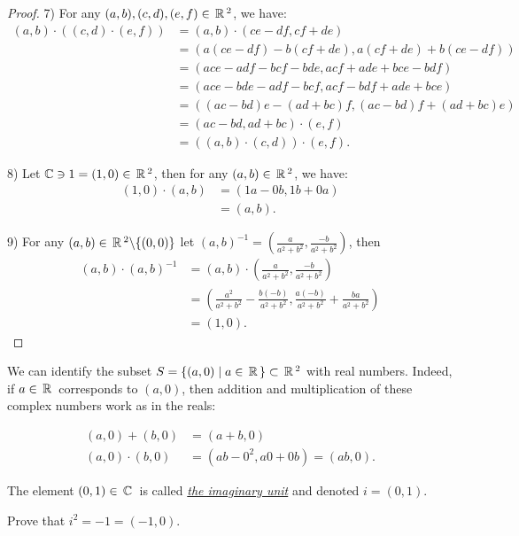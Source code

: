\begin{proof}
7) For any $(a, b),(c, d),(e, f) \in \,\mathbb{R}\,^2$, we have:
$$
\begin{aligned}
(a, b) \cdot((c, d) \cdot(e, f)) & =(a, b) \cdot(c e-d f, c f+d e) \\
& =(a(c e-d f)-b(c f+d e), a(c f+d e)+b(c e-d f)) \\
& =(a c e-a d f-b c f-b d e, a c f+a d e+b c e-b d f) \\
& =(a c e-b d e-a d f-b c f, a c f-b d f+a d e+b c e) \\
& =((a c-b d) e-(a d+b c) f,(a c-b d) f+(a d+b c) e) \\
& =(a c-b d, a d+b c) \cdot(e, f) \\
& =((a, b) \cdot(c, d)) \cdot(e, f) .
\end{aligned}
$$

8) Let $\mathbb{C} \ni 1 = (1,0) \in \,\mathbb{R}\,^2$, then for any $(a, b) \in \,\mathbb{R}\,^2$, we have:
$$
\begin{aligned}
(1,0) \cdot(a, b) & =(1 a-0 b, 1 b+0 a) \\
& =(a, b) .
\end{aligned}
$$

9) For any $(a, b) \in \,\mathbb{R}\,^2 \backslash\{(0,0)\}$ let $(a, b)^{-1} = \left(\frac{a}{a^2+b^2}, \frac{-b}{a^2+b^2}\right)$, then
$$
\begin{aligned}
(a, b) \cdot(a, b)^{-1} & =(a, b) \cdot\left(\frac{a}{a^2+b^2}, \frac{-b}{a^2+b^2}\right) \\
& =\left(\frac{a^2}{a^2+b^2}-\frac{b(-b)}{a^2+b^2}, \frac{a(-b)}{a^2+b^2}+\frac{b a}{a^2+b^2}\right) \\
& =(1,0) .
\end{aligned}
$$
\end{proof}

We can identify the subset $S=\{(a, 0) \mid a \in \,\mathbb{R}\,\} \subset \,\mathbb{R}\,^2$ with real numbers. Indeed, if $a\in\,\mathbb{R}\,$ corresponds to $(a, 0)$, then addition and multiplication of these complex numbers work as in the reals: 

$$
\begin{aligned}
(a, 0)+(b, 0) & =(a+b, 0)\\
(a, 0) \cdot(b, 0) & =\left(a b-0^2, a 0+0 b\right)=(a b, 0).
\end{aligned}
$$

\begin{definition}
The element $(0, 1)\in \,\mathbb{C}\,$ is called \underline{\it the imaginary unit} and denoted $i = (0, 1)$.
\end{definition}

\begin{exercise}
Prove that $i^2 = -1 = (-1, 0)$.
\end{exercise}

